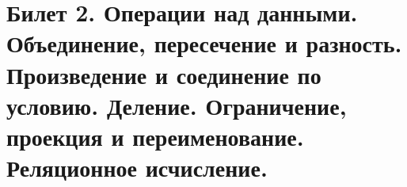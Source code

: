 \newpage
\section{Билет 2. Операции над данными. Объединение, пересечение и разность. Произведение и соединение по условию. Деление. Ограничение, проекция и переименование. Реляционное исчисление.}